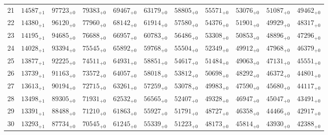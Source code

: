 \documentclass[10pt, a4paper]{article}
\begin{document}
\begin{center}
\begin{tabular}{c || c c c c c | c c c c c}
        \hline
        21 & \({14587}_{+1}\) & \({97723}_{+0}\) & \({79383}_{+0}\) & \({69467}_{+0}\) & \({63179}_{+0}\) & \({58805}_{+0}\) & \({55571}_{+0}\) & \({53076}_{+0}\) & \({51087}_{+0}\) & \({49462}_{+0}\)\\
        22 & \({14380}_{+1}\) & \({96120}_{+0}\) & \({77960}_{+0}\) & \({68142}_{+0}\) & \({61914}_{+0}\) & \({57580}_{+0}\) & \({54376}_{+0}\) & \({51901}_{+0}\) & \({49929}_{+0}\) & \({48317}_{+0}\)\\
        23 & \({14195}_{+1}\) & \({94685}_{+0}\) & \({76688}_{+0}\) & \({66957}_{+0}\) & \({60783}_{+0}\) & \({56486}_{+0}\) & \({53308}_{+0}\) & \({50853}_{+0}\) & \({48896}_{+0}\) & \({47296}_{+0}\)\\
        24 & \({14028}_{+1}\) & \({93394}_{+0}\) & \({75545}_{+0}\) & \({65892}_{+0}\) & \({59768}_{+0}\) & \({55504}_{+0}\) & \({52349}_{+0}\) & \({49912}_{+0}\) & \({47968}_{+0}\) & \({46379}_{+0}\)\\
        25 & \({13877}_{+1}\) & \({92225}_{+0}\) & \({74511}_{+0}\) & \({64931}_{+0}\) & \({58851}_{+0}\) & \({54617}_{+0}\) & \({51484}_{+0}\) & \({49063}_{+0}\) & \({47131}_{+0}\) & \({45551}_{+0}\)\\
        \hline
        26 & \({13739}_{+1}\) & \({91163}_{+0}\) & \({73572}_{+0}\) & \({64057}_{+0}\) & \({58018}_{+0}\) & \({53812}_{+0}\) & \({50698}_{+0}\) & \({48292}_{+0}\) & \({46372}_{+0}\) & \({44801}_{+0}\)\\
        27 & \({13613}_{+1}\) & \({90194}_{+0}\) & \({72715}_{+0}\) & \({63261}_{+0}\) & \({57259}_{+0}\) & \({53078}_{+0}\) & \({49983}_{+0}\) & \({47590}_{+0}\) & \({45680}_{+0}\) & \({44117}_{+0}\)\\
        28 & \({13498}_{+1}\) & \({89305}_{+0}\) & \({71931}_{+0}\) & \({62532}_{+0}\) & \({56565}_{+0}\) & \({52407}_{+0}\) & \({49328}_{+0}\) & \({46947}_{+0}\) & \({45047}_{+0}\) & \({43491}_{+0}\)\\
        29 & \({13391}_{+1}\) & \({88488}_{+0}\) & \({71210}_{+0}\) & \({61863}_{+0}\) & \({55927}_{+0}\) & \({51791}_{+0}\) & \({48727}_{+0}\) & \({46358}_{+0}\) & \({44466}_{+0}\) & \({42917}_{+0}\)\\
        30 & \({13293}_{+1}\) & \({87734}_{+0}\) & \({70545}_{+0}\) & \({61245}_{+0}\) & \({55339}_{+0}\) & \({51223}_{+0}\) & \({48173}_{+0}\) & \({45814}_{+0}\) & \({43930}_{+0}\) & \({42388}_{+0}\)\\
        \hline
    \end{tabular}
    \pagebreak
    \begin{tabular}{c || c c c c c | c c c c c}

\end{tabular}
\end{center}
\end{document}
